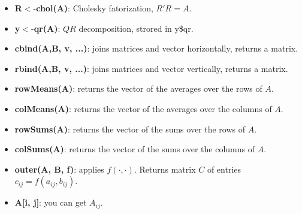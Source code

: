 \begin{itemize}
	\item \textbf{R}$<$-\textbf{chol(A)}: Cholesky fatorization, $R'R=A$.
	\item \textbf{y}$<$-\textbf{qr(A)}: $QR$ decomposition, strored in y\$qr.
	\item \textbf{cbind(A,B, v, ...)}: joins matrices and vector horizontally, returns a matrix.
	\item \textbf{rbind(A,B, v, ...)}: joins matrices and vector vertically, returns a matrix.
	\item \textbf{rowMeans(A)}: returns the vector of the averages over the rows of $A$.
	\item \textbf{colMeans(A)}: returns the vector of the averages over the columns of $A$.
	\item \textbf{rowSums(A)}: returns the vector of the sums over the rows of $A$.
	\item \textbf{colSums(A)}: returns the vector of the sums over the columns of $A$.
	\item \textbf{outer(A, B, f)}: applies $f(\cdot, \cdot)$. Returns matrix $C$ of entries $c_{ij}=f(a_{ij}, b_{ij})$.
	\item \textbf{A[i, j]}: you can get $A_{ij}$.
\end{itemize}

\label{sec:systems}
